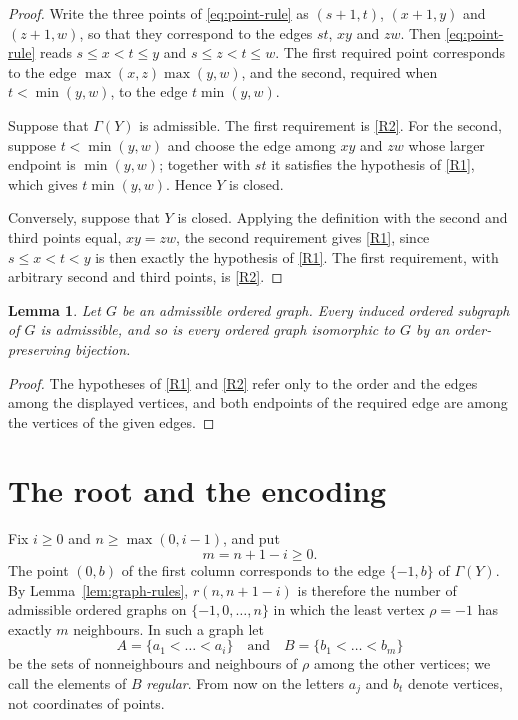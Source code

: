 \documentclass[11pt]{amsart}
\newtheorem{lemma}[theorem]{Lemma}
\theoremstyle{definition}
\theoremstyle{remark}
\numberwithin{equation}{section}
\begin{document}
\begin{proof}
Write the three points of \eqref{eq:point-rule} as $(s+1,t)$, $(x+1,y)$ and $(z+1,w)$, so that they correspond to the edges $st$, $xy$ and $zw$. Then \eqref{eq:point-rule} reads $s\le x<t\le y$ and $s\le z<t\le w$. The first required point corresponds to the edge $\max(x,z)\max(y,w)$, and the second, required when $t<\min(y,w)$, to the edge $t\min(y,w)$.

Suppose that $\Gamma(Y)$ is admissible. The first requirement is \ref{R2}. For the second, suppose $t<\min(y,w)$ and choose the edge among $xy$ and $zw$ whose larger endpoint is $\min(y,w)$; together with $st$ it satisfies the hypothesis of \ref{R1}, which gives $t\min(y,w)$. Hence $Y$ is closed.

Conversely, suppose that $Y$ is closed. Applying the definition with the second and third points equal, $xy=zw$, the second requirement gives \ref{R1}, since $s\le x<t<y$ is then exactly the hypothesis of \ref{R1}. The first requirement, with arbitrary second and third points, is \ref{R2}.
\end{proof}

\begin{lemma}\label{lem:hereditary}
Let $G$ be an admissible ordered graph. Every induced ordered subgraph of $G$ is admissible, and so is every ordered graph isomorphic to $G$ by an order-preserving bijection.
\end{lemma}

\begin{proof}
The hypotheses of \ref{R1} and \ref{R2} refer only to the order and the edges among the displayed vertices, and both endpoints of the required edge are among the vertices of the given edges.
\end{proof}

\section{The root and the encoding}\label{sec:encoding}

Fix $i\ge0$ and $n\ge\max(0,i-1)$, and put
\[
m=n+1-i\ge0.
\]
The point $(0,b)$ of the first column corresponds to the edge $\{-1,b\}$ of $\Gamma(Y)$. By Lemma~\ref{lem:graph-rules}, $r(n,n+1-i)$ is therefore the number of admissible ordered graphs on $\{-1,0,\dots,n\}$ in which the least vertex $\rho=-1$ has exactly $m$ neighbours. In such a graph let
\[
A=\{a_1<\dots<a_i\}\quad\text{and}\quad B=\{b_1<\dots<b_m\}
\]
be the sets of nonneighbours and neighbours of $\rho$ among the other vertices; we call the elements of $B$ \emph{regular}. From now on the letters $a_j$ and $b_t$ denote vertices, not coordinates of points.
\end{document}
